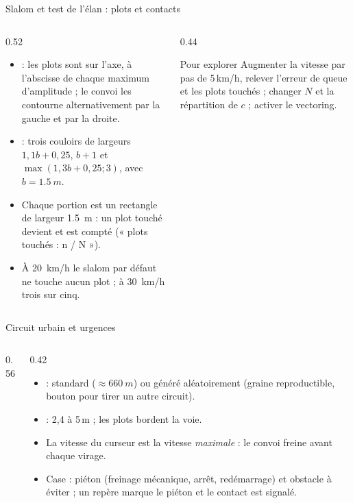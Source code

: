 \documentclass[aspectratio=169,9pt]{beamer}
\begin{document}
\begin{frame}{Slalom et test de l'élan : plots et contacts}
  \begin{columns}[T]
  \begin{column}{0.52\textwidth}
    \begin{itemize}
      \item {} : les plots sont sur l'axe, à l'abscisse de chaque maximum d'amplitude ; le convoi les contourne alternativement par la gauche et par la droite.
      \item {} : trois couloirs de largeurs $1{,}1b+0{,}25$, $b+1$ et $\max(1{,}3b+0{,}25;3)$, avec $b=\SI{1,5}{m}$.
      \item Chaque portion est un rectangle de largeur \SI{1,5}{m} : un plot touché devient  et est compté (« plots touchés : n / N »).
      \item À \SI{20}{km/h} le slalom par défaut ne touche aucun plot ; à \SI{30}{km/h} trois sur cinq.
    \end{itemize}
  \end{column}
  \begin{column}{0.44\textwidth}
    \begin{block}{Pour explorer}
      Augmenter la vitesse par pas de 5\,km/h, relever l'erreur de queue et les plots touchés ; changer $N$ et la répartition de $c$ ; activer le vectoring.
    \end{block}
  \end{column}
  \end{columns}
\end{frame}

\begin{frame}{Circuit urbain et urgences}
  \begin{columns}[T]
  \begin{column}{0.56\textwidth}
  \end{column}
  \begin{column}{0.42\textwidth}
    \small
    \begin{itemize}
      \item {} : standard ($\approx\SI{660}{m}$) ou généré aléatoirement (graine reproductible, bouton pour tirer un autre circuit).
      \item {} : 2,4 à 5\,m ; les plots bordent la voie.
      \item La vitesse du curseur est la vitesse \emph{maximale} : le convoi freine avant chaque virage.
      \item Case  : piéton (freinage mécanique, arrêt, redémarrage) et obstacle à éviter ; un repère marque le piéton et le contact est signalé.
    \end{itemize}
  \end{column}
  \end{columns}
\end{frame}
\end{document}
